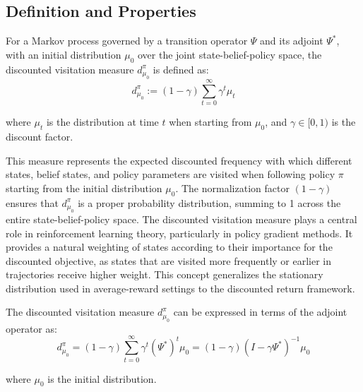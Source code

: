 \subsection{Definition and Properties}
\begin{definition}
    For a Markov process governed by a transition operator $\Psi$ and its adjoint $\Psi
        ^{*}$, with an initial distribution $\mu_{0}$ over the joint state-belief-policy
    space, the discounted visitation measure $d^{\pi}_{\mu_0}$ is defined as:
    \begin{equation}
        d^{\pi}_{\mu_0}:= (1-\gamma) \sum_{t=0}^{\infty}\gamma^{t} \mu_{t}
    \end{equation}

    where $\mu_{t}$ is the distribution at time $t$ when starting from $\mu_{0}$,
    and $\gamma \in [0, 1)$ is the discount factor.
\end{definition}This measure represents the expected discounted frequency with which
different states, belief states, and policy parameters are visited when following
policy $\pi$ starting from the initial distribution $\mu_{0}$. The normalization
factor $(1-\gamma)$ ensures that $d^{\pi}_{\mu_0}$ is a proper probability
distribution, summing to 1 across the entire state-belief-policy space. The discounted
visitation measure plays a central role in reinforcement learning theory,
particularly in policy gradient methods. It provides a natural weighting of states
according to their importance for the discounted objective, as states that are
visited more frequently or earlier in trajectories receive higher weight. This concept
generalizes the stationary distribution used in average-reward settings to the discounted
return framework.
\begin{lemma}
    The discounted visitation measure $d^{\pi}_{\mu_0}$ can be expressed in terms of
    the adjoint operator as:
    \begin{equation}
        d^{\pi}_{\mu_0}= (1-\gamma) \sum_{t=0}^{\infty}\gamma^{t} (\Psi^{*})^{t} \mu_{0}
        = (1-\gamma)(I - \gamma\Psi^{*})^{-1}\mu_{0}
    \end{equation}

    where $\mu_{0}$ is the initial distribution.
\end{lemma}
